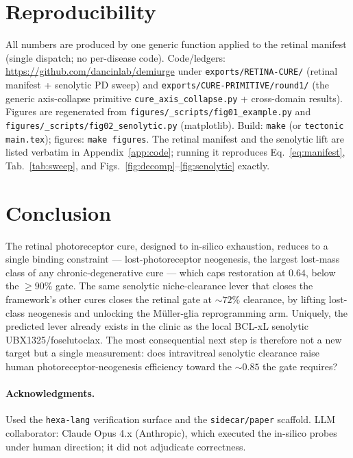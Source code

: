\documentclass[11pt,a4paper]{article}
\begin{document}
\section{Reproducibility}
\label{sec:repro}
All numbers are produced by one generic function applied to the retinal manifest (single dispatch;
no per-disease code). Code/ledgers: \url{https://github.com/dancinlab/demiurge} under
\texttt{exports/RETINA-CURE/} (retinal manifest + senolytic PD sweep) and
\texttt{exports/CURE-PRIMITIVE/round1/} (the generic axis-collapse primitive
\texttt{cure\_axis\_collapse.py} + cross-domain results). Figures are regenerated from
\texttt{figures/\_scripts/fig01\_example.py} and \texttt{figures/\_scripts/fig02\_senolytic.py}
(matplotlib). Build: \texttt{make} (or \texttt{tectonic main.tex}); figures: \texttt{make figures}.
The retinal manifest and the senolytic lift are listed verbatim in Appendix~\ref{app:code};
running it reproduces Eq.~\eqref{eq:manifest}, Tab.~\ref{tab:sweep}, and
Figs.~\ref{fig:decomp}--\ref{fig:senolytic} exactly.

\section{Conclusion}
\label{sec:conclusion}
The retinal photoreceptor cure, designed to in-silico exhaustion, reduces to a single binding
constraint --- lost-photoreceptor neogenesis, the largest lost-mass class of any
chronic-degenerative cure --- which caps restoration at $0.64$, below the $\geq 90\%$ gate. The
same senolytic niche-clearance lever that closes the framework's other cures closes the retinal
gate at ${\sim}72\%$ clearance, by lifting lost-class neogenesis and unlocking the M\"uller-glia
reprogramming arm. Uniquely, the predicted lever already exists in the clinic as the local BCL-xL
senolytic UBX1325/foselutoclax. The most consequential next step is therefore not a new target but
a single measurement: does intravitreal senolytic clearance raise human photoreceptor-neogenesis
efficiency toward the ${\sim}0.85$ the gate requires?

\paragraph{Acknowledgments.}
Used the \texttt{hexa-lang} verification surface and the \texttt{sidecar/paper} scaffold.
LLM collaborator: Claude Opus 4.x (Anthropic), which executed the in-silico probes under human
direction; it did not adjudicate correctness.
\end{document}
